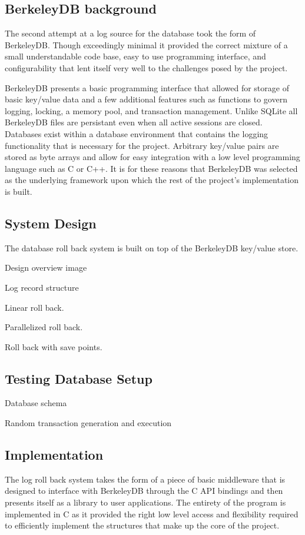 \documentclass{article}
\begin{document}
\subsection{BerkeleyDB background}
The second attempt at a log source for the database took the form of BerkeleyDB. Though exceedingly minimal it provided the correct mixture of a small understandable code base, easy to use programming interface, and configurability that lent itself very well to the challenges posed by the project.

BerkeleyDB presents a basic programming interface that allowed for storage of basic key/value data and a few additional features such as functions to govern logging, locking, a memory pool, and transaction management. Unlike SQLite all BerkeleyDB files are persistant even when all active sessions are closed. Databases exist within a database environment that contains the logging functionality that is necessary for the project. Arbitrary key/value pairs are stored as byte arrays and allow for easy integration with a low level programming language such as C or C++. It is for these reasons that BerkeleyDB was selected as the underlying framework upon which the rest of the project's implementation is built.

\subsection{System Design}
The database roll back system is built on top of the BerkeleyDB key/value store. 

Design overview image

Log record structure

Linear roll back.

Parallelized roll back.

Roll back with save points.

\subsection{Testing Database Setup}

Database schema

Random transaction generation and execution

\subsection{Implementation}
The log roll back system takes the form of a piece of basic middleware that is designed to interface with BerkeleyDB through the C API bindings and then presents itself as a library to user applications. The entirety of the program is implemented in C as it provided the right low level access and flexibility required to efficiently implement the structures that make up the core of the project.
\end{document}
